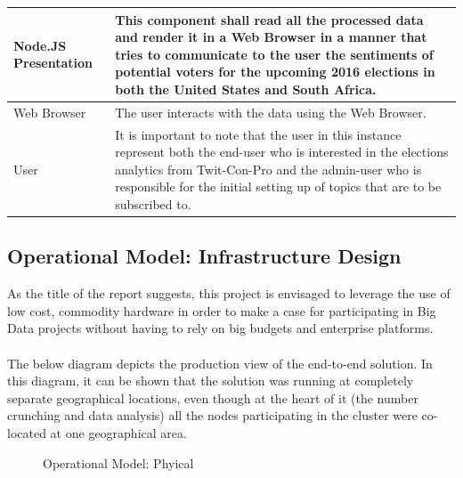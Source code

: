 \documentclass[12pt]{article} %
\begin{document}
\begin{center}
\begin{tabular}{ | l | p{12.7cm} |}
			\hline
			Node.JS Presentation & This component shall read all the processed data and render it in a Web Browser in a manner that tries to communicate to the user the sentiments of potential voters for the upcoming 2016 elections in both the United States and South Africa.\\
			\hline
			Web Browser & The user interacts with the data using the Web Browser.\\
			\hline
			User & It is important to note that the user in this instance represent both the end-user who is interested in the elections analytics from Twit-Con-Pro and the admin-user who is responsible for the initial setting up of topics that are to be subscribed to.\\
			\hline
		\end{tabular}
	\end{center}
	
	\subsection{Operational Model: Infrastructure Design}
	
	As the title of the report suggests, this project is envisaged to leverage the use of low cost, commodity hardware in order to make a case for participating in Big Data projects without having to rely on big budgets and enterprise platforms.
	\\
	\\
	The below diagram depicts the production view of the end-to-end solution. In this diagram, it can be shown that the solution was running at completely separate geographical locations, even though at the heart of it (the number crunching and data analysis) all the nodes participating in the cluster were co-located at one geographical area.
	
		\begin{figure}[H] %
			\caption{Operational Model: Phyical}
			\label{fig:speciation}
		\end{figure}
	
\end{document}
